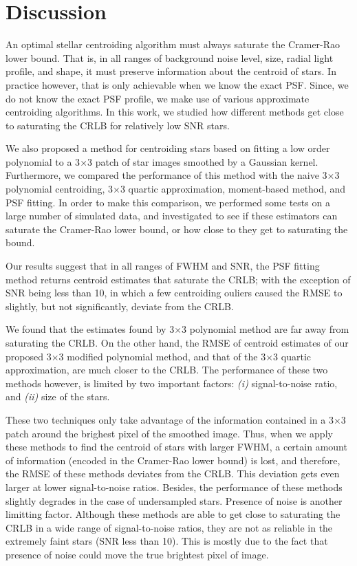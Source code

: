 \documentclass[12pt, preprint]{aastex}
\begin{document}
\section{Discussion}\label{sec:discussion}

An optimal stellar centroiding algorithm must always saturate the Cramer-Rao lower 
bound. That is, in all ranges of background noise level, size, radial light profile,
and shape, it must preserve information about the centroid of stars. In practice however,
that is only achievable when we know the exact PSF. Since, we do not know the exact PSF
profile, we make use of various approximate centroiding algorithms. In this work, we
studied how different methods get close to saturating the CRLB for relatively low SNR
stars.
 
We also proposed a method for centroiding stars based on fitting a low order
polynomial to a 3$\times$3 patch of star images smoothed by a Gaussian kernel. 
Furthermore, we compared the performance of this method with the naive 3$\times$3 polynomial
centroiding, 3$\times$3 quartic approximation, moment-based method, and PSF fitting.
In order to make this comparison, we performed some tests on a large number of
simulated data, and investigated to see if these estimators can saturate the Cramer-Rao
lower bound, or how close to they get to saturating the bound. 

Our results suggest that in all ranges of FWHM and SNR, the PSF fitting method returns 
centroid estimates that saturate the CRLB; with the exception of SNR being less than 10, 
in which a few centroiding ouliers caused the RMSE to slightly, but not significantly, deviate
from the CRLB. 

We found that the estimates found by 3$\times$3 polynomial method are far away from
saturating the CRLB. On the other hand, the RMSE of centroid estimates of our proposed
3$\times$3 modified polynomial method, and that of the 3$\times$3 quartic approximation,
are much closer to the CRLB. The performance of these two methods however, is limited by
two important factors: \emph{(i)} signal-to-noise ratio, and \emph{(ii)} size of the stars.

These two techniques only take advantage of the information contained in a 3$\times$3
patch around the brighest pixel of the smoothed image. Thus, when we apply 
these methods to find the centroid of stars with larger FWHM, a certain amount of
information (encoded in the Cramer-Rao lower bound) is lost, and therefore, the RMSE
of these methods deviates from the CRLB. This deviation gets even larger at lower
signal-to-noise ratios. Besides, the performance of these methods slightly degrades
in the case of undersampled stars. Presence of noise is another limitting factor.
Although these methods are able to get close to saturating the CRLB in a wide range of
signal-to-noise ratios, they are not as reliable in the extremely faint stars
(SNR less than 10). This is mostly due to the fact that presence of noise could
move the true brightest pixel of image. 
\end{document}
